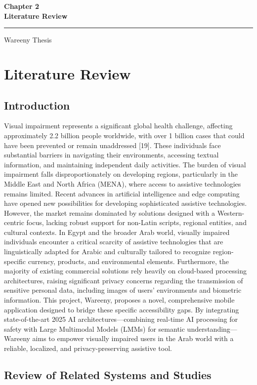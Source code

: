 \documentclass[12pt,a4paper]{report}
\newcommand{\chaptercover}[1]{%
  \clearpage
  \thispagestyle{empty}
  \vspace*{\fill}
  \begin{center}
    {\Huge\bfseries #1\par}
    \vspace{0.8cm}
    \rule{0.35\textwidth}{1pt}\par
    \vspace{0.6cm}
    {\Large Wareeny Thesis\par}
  \end{center}
  \vspace*{\fill}
  \clearpage
}
\begin{document}
\chaptercover{Chapter 2\\Literature Review}
\chapter{Literature Review}

\section{Introduction}

Visual impairment represents a significant global health challenge, affecting approximately 2.2 billion people worldwide, with over 1 billion cases that could have been prevented or remain unaddressed [19]. These individuals face substantial barriers in navigating their environments, accessing textual information, and maintaining independent daily activities. The burden of visual impairment falls disproportionately on developing regions, particularly in the Middle East and North Africa (MENA), where access to assistive technologies remains limited. Recent advances in artificial intelligence and edge computing have opened new possibilities for developing sophisticated assistive technologies. However, the market remains dominated by solutions designed with a Western-centric focus, lacking robust support for non-Latin scripts, regional entities, and cultural contexts. In Egypt and the broader Arab world, visually impaired individuals encounter a critical scarcity of assistive technologies that are linguistically adapted for Arabic and culturally tailored to recognize region-specific currency, products, and environmental elements. Furthermore, the majority of existing commercial solutions rely heavily on cloud-based processing architectures, raising significant privacy concerns regarding the transmission of sensitive personal data, including images of users' environments and biometric information. This project, Wareeny, proposes a novel, comprehensive mobile application designed to bridge these specific accessibility gaps. By integrating state-of-the-art 2025 AI architectures---combining real-time AI processing for safety with Large Multimodal Models (LMMs) for semantic understanding---Wareeny aims to empower visually impaired users in the Arab world with a reliable, localized, and privacy-preserving assistive tool.

\section{Review of Related Systems and Studies}
\end{document}
